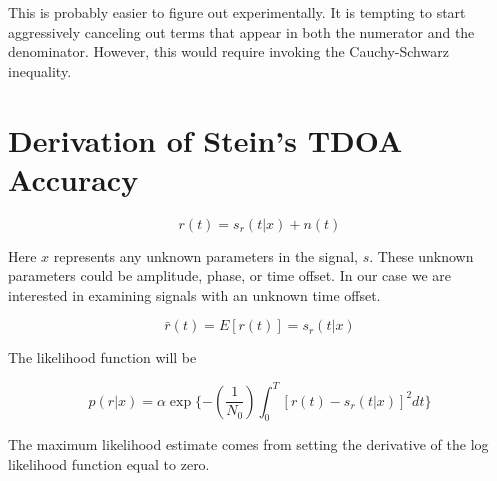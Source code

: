\documentclass[11pt]{article}
\begin{document}







This is probably easier to figure out experimentally. It is tempting to start aggressively canceling out terms that appear in both the numerator and the denominator. However, this would require invoking the Cauchy-Schwarz inequality.

\section{Derivation of Stein's TDOA Accuracy}

\begin{equation}
r(t) = s_r(t|x) + n(t)
\end{equation}

Here $x$ represents any unknown parameters in the signal, $s$. These unknown parameters could be amplitude, phase, or time offset. In our case we are interested in examining signals with an unknown time offset.

\begin{equation}
\bar{r}(t) = E[r(t)] = s_r(t|x)
\end{equation}

The likelihood function will be

\begin{equation}
p(r|x) 
=
\alpha \exp \{ - \left( \frac{1}{N_0} \right) \int^T_0 \left[ r(t) - s_r(t|x) \right]^2 dt \}
\end{equation}


The maximum likelihood estimate comes from setting the derivative of the log likelihood function equal to zero.
\end{document}
